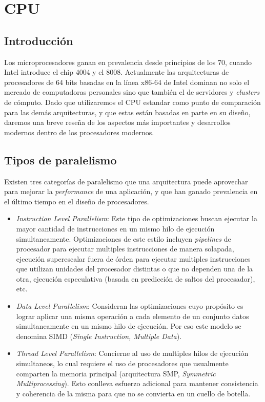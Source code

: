 \section {CPU}

\subsection{Introducci\'on}

Los microprocesadores ganan en prevalencia desde principios de los 70,
cuando Intel introduce el chip 4004 y el 8008. Actualmente las arquitecturas
de procesadores de 64 bits basadas en la l\'inea x86-64 de Intel
dominan no solo el mercado de computadoras personales sino que tambi\'en el de
servidores y \textit{clusters} de c\'omputo. Dado que utilizaremos el CPU
estandar como punto de comparaci\'on para las dem\'as arquitecturas, y que estas
est\'an basadas en parte en su dise\~no, daremos una breve rese\~na de los aspectos
m\'as importantes y desarrollos modernos dentro de los procesadores modernos.

\subsection{Tipos de paralelismo}

Existen tres categor\'ias de paralelismo que una arquitectura puede aprovechar
para mejorar la \textit{performance} de una aplicaci\'on, y que han ganado prevalencia
en el \'ultimo tiempo en el dise\~no de procesadores.

\begin{itemize}
    \item \textit{Instruction Level Parallelism}: Este tipo de optimizaciones buscan
    ejecutar la mayor cantidad de instrucciones en un mismo hilo de ejecuci\'on simultaneamente.
    Optimizaciones de este estilo incluyen
    \textit{pipelines} de procesador para ejecutar multiples instrucciones de manera solapada,
    ejecuci\'on superescalar fuera de \'orden para ejecutar multiples instrucciones que
    utilizan unidades del procesador distintas o que no dependen una de la otra, ejecuci\'on
    especulativa (basada en predicci\'on de saltos del procesador), etc.

    \item \textit{Data Level Parallelism}: Consideran las optimizaciones cuyo prop\'osito es
    lograr aplicar una misma operaci\'on a cada elemento de un conjunto datos simultaneamente
    en un mismo hilo de ejecuci\'on.  Por eso este modelo se denomina SIMD
    (\textit{Single Instruction, Multiple Data}).

    \item \textit{Thread Level Parallelism}: Concierne al uso de multiples hilos de ejecuci\'on
    simultaneos, lo cual requiere el uso de procesadores que usualmente
    comparten la memoria principal (arquitectura SMP, \textit{Symmetric Multiprocessing}).
    Esto conlleva esfuerzo adicional para mantener consistencia y coherencia de la misma
    para que no se convierta en un cuello de botella.
\end{itemize}


